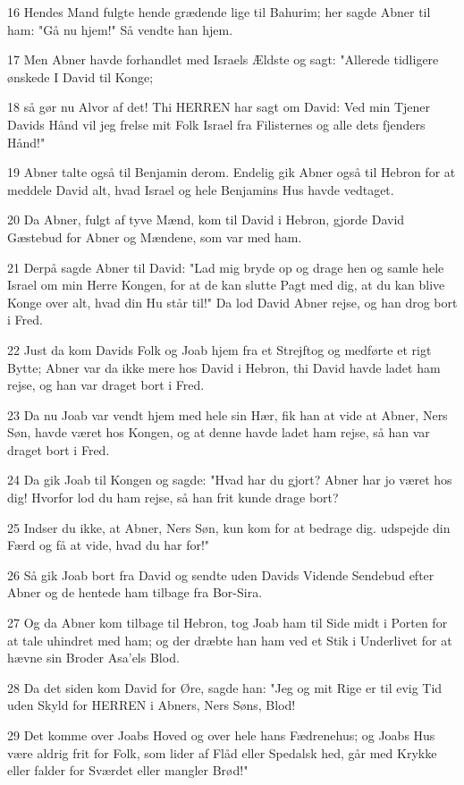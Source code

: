 \par 16 Hendes Mand fulgte hende grædende lige til Bahurim; her sagde Abner til ham: "Gå nu hjem!" Så vendte han hjem.
\par 17 Men Abner havde forhandlet med Israels Ældste og sagt: "Allerede tidligere ønskede I David til Konge;
\par 18 så gør nu Alvor af det! Thi HERREN har sagt om David: Ved min Tjener Davids Hånd vil jeg frelse mit Folk Israel fra Filisternes og alle dets fjenders Hånd!"
\par 19 Abner talte også til Benjamin derom. Endelig gik Abner også til Hebron for at meddele David alt, hvad Israel og hele Benjamins Hus havde vedtaget.
\par 20 Da Abner, fulgt af tyve Mænd, kom til David i Hebron, gjorde David Gæstebud for Abner og Mændene, som var med ham.
\par 21 Derpå sagde Abner til David: "Lad mig bryde op og drage hen og samle hele Israel om min Herre Kongen, for at de kan slutte Pagt med dig, at du kan blive Konge over alt, hvad din Hu står til!" Da lod David Abner rejse, og han drog bort i Fred.
\par 22 Just da kom Davids Folk og Joab hjem fra et Strejftog og medførte et rigt Bytte; Abner var da ikke mere hos David i Hebron, thi David havde ladet ham rejse, og han var draget bort i Fred.
\par 23 Da nu Joab var vendt hjem med hele sin Hær, fik han at vide at Abner, Ners Søn, havde været hos Kongen, og at denne havde ladet ham rejse, så han var draget bort i Fred.
\par 24 Da gik Joab til Kongen og sagde: "Hvad har du gjort? Abner har jo været hos dig! Hvorfor lod du ham rejse, så han frit kunde drage bort?
\par 25 Indser du ikke, at Abner, Ners Søn, kun kom for at bedrage dig. udspejde din Færd og få at vide, hvad du har for!"
\par 26 Så gik Joab bort fra David og sendte uden Davids Vidende Sendebud efter Abner og de hentede ham tilbage fra Bor-Sira.
\par 27 Og da Abner kom tilbage til Hebron, tog Joab ham til Side midt i Porten for at tale uhindret med ham; og der dræbte han ham ved et Stik i Underlivet for at hævne sin Broder Asa'els Blod.
\par 28 Da det siden kom David for Øre, sagde han: "Jeg og mit Rige er til evig Tid uden Skyld for HERREN i Abners, Ners Søns, Blod!
\par 29 Det komme over Joabs Hoved og over hele hans Fædrenehus; og Joabs Hus være aldrig frit for Folk, som lider af Flåd eller Spedalsk hed, går med Krykke eller falder for Sværdet eller mangler Brød!"
